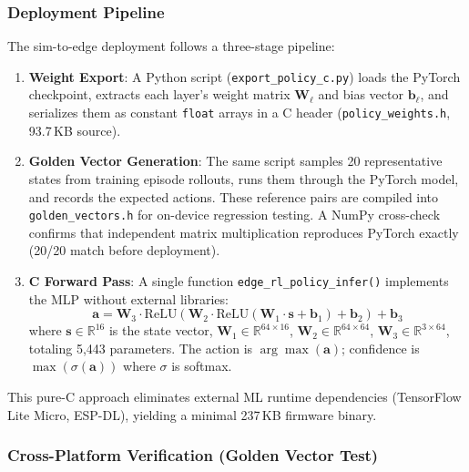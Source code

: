 \subsubsection{Deployment Pipeline}

The sim-to-edge deployment follows a three-stage pipeline:

\begin{enumerate}
    \item \textbf{Weight Export}: A Python script (\texttt{export\_policy\_c.py}) loads the PyTorch checkpoint, extracts each layer's weight matrix $\mathbf{W}_\ell$ and bias vector $\mathbf{b}_\ell$, and serializes them as constant \texttt{float} arrays in a C header (\texttt{policy\_weights.h}, 93.7\,KB source).

    \item \textbf{Golden Vector Generation}: The same script samples 20 representative states from training episode rollouts, runs them through the PyTorch model, and records the expected actions. These reference pairs are compiled into \texttt{golden\_vectors.h} for on-device regression testing. A NumPy cross-check confirms that independent matrix multiplication reproduces PyTorch exactly (20/20 match before deployment).

    \item \textbf{C Forward Pass}: A single function \texttt{edge\_rl\_policy\_infer()} implements the MLP without external libraries:
    \begin{equation}
    \label{eq:mlp_fwd}
    \mathbf{a} = \mathbf{W}_3 \cdot \text{ReLU}\!\left(\mathbf{W}_2 \cdot \text{ReLU}\!\left(\mathbf{W}_1 \cdot \mathbf{s} + \mathbf{b}_1\right) + \mathbf{b}_2\right) + \mathbf{b}_3
    \end{equation}
    where $\mathbf{s} \in \mathbb{R}^{16}$ is the state vector, $\mathbf{W}_1 \in \mathbb{R}^{64 \times 16}$, $\mathbf{W}_2 \in \mathbb{R}^{64 \times 64}$, $\mathbf{W}_3 \in \mathbb{R}^{3 \times 64}$, totaling 5{,}443 parameters. The action is $\arg\max(\mathbf{a})$; confidence is $\max\!\left(\sigma(\mathbf{a})\right)$ where $\sigma$ is softmax.
\end{enumerate}

This pure-C approach eliminates external ML runtime dependencies (TensorFlow Lite Micro, ESP-DL), yielding a minimal 237\,KB firmware binary.

\subsubsection{Cross-Platform Verification (Golden Vector Test)}

